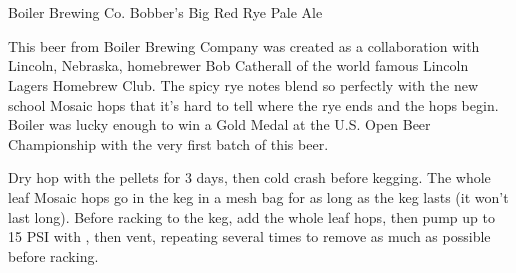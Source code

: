 \part{\styleamericanale}

\begin{recipie}{Boiler Brewing Co. Bobber's Big Red Rye Pale Ale}

\begin{aboutblock}
This beer from Boiler Brewing Company was created as a collaboration with Lincoln, Nebraska,
homebrewer Bob Catherall of the world famous Lincoln Lagers Homebrew Club. The spicy rye notes
blend so perfectly with the new school Mosaic hops that it's hard to tell where the rye ends
and the hops begin. Boiler was lucky enough to win a Gold Medal at the U.S. Open Beer Championship
with the very first batch of this beer.
\end{aboutblock}


\begin{methodandtiming}
 
\begin{mashsteps}
\end{mashsteps}

\begin{fermentationsteps}
\end{fermentationsteps}

\begin{directions}
Dry hop with the pellets for 3 days, then cold crash before kegging. The whole leaf Mosaic
hops go in the keg in a mesh bag for as long as the keg lasts (it won't last long). Before
racking to the keg, add the whole leaf hops, then pump up to 15 PSI with , then vent,
repeating several times to remove as much  as possible before racking.
\end{directions}

\end{methodandtiming}

\pagebreak

\begin{ingredientsblock}

\begin{malts}
\end{malts}


\end{ingredientsblock}
\end{recipie}
